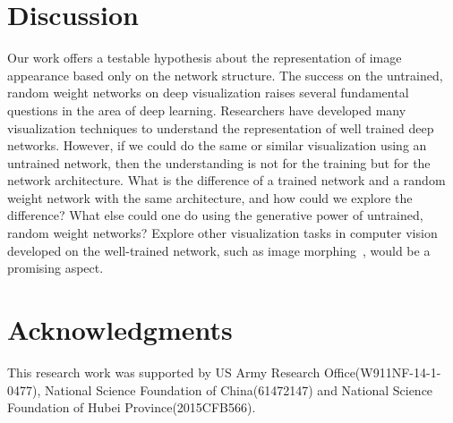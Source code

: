 \documentclass{article}
\begin{document}
\vspace{-0.5em}
\section{Discussion}


Our work offers a testable hypothesis about the representation of image appearance based only on the network structure.
The success on the untrained, random weight networks on deep visualization raises several fundamental questions in the area of deep learning.
Researchers have developed many visualization techniques to understand the representation of well trained deep networks. However, if we could do the same or similar visualization using an untrained network, then the understanding is not for the training but for the network architecture.
What is the difference of a trained network and a random weight network with the same architecture, and how could we explore the difference?
What else could one do using the generative power of untrained, random weight networks?
Explore other visualization tasks in computer vision developed on the well-trained network, such as image morphing~\cite{Traversal2015}, would be a promising aspect.


\section*{Acknowledgments}
This research work was supported by US Army Research Office(W911NF-14-1-0477), National Science Foundation of China(61472147) and National Science Foundation of Hubei Province(2015CFB566).

\small

\end{document}
